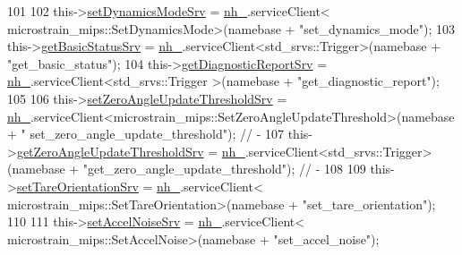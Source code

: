 \begin{DoxyCode}
101 
102                 this->\hyperlink{classcl__microstrain__mips_1_1ClMicrostainMips_a43a684f4010debc4a2ba17d9784712d6}{setDynamicsModeSrv} = \hyperlink{classcl__microstrain__mips_1_1ClMicrostainMips_a5a39ba0864ba2c4c003b6ea427538243}{nh\_}.serviceClient<
      microstrain\_mips::SetDynamicsMode>(namebase + \textcolor{stringliteral}{"set\_dynamics\_mode"});
103                 this->\hyperlink{classcl__microstrain__mips_1_1ClMicrostainMips_ab2d9efccc6237800a890135a4249eaf8}{getBasicStatusSrv} = \hyperlink{classcl__microstrain__mips_1_1ClMicrostainMips_a5a39ba0864ba2c4c003b6ea427538243}{nh\_}.serviceClient<std\_srvs::Trigger>(namebase
       + \textcolor{stringliteral}{"get\_basic\_status"});
104                 this->\hyperlink{classcl__microstrain__mips_1_1ClMicrostainMips_a3d4329c798aa4b7cab1320f35f270192}{getDiagnosticReportSrv} = \hyperlink{classcl__microstrain__mips_1_1ClMicrostainMips_a5a39ba0864ba2c4c003b6ea427538243}{nh\_}.serviceClient<std\_srvs::Trigger
      >(namebase + \textcolor{stringliteral}{"get\_diagnostic\_report"});
105 
106                 this->\hyperlink{classcl__microstrain__mips_1_1ClMicrostainMips_a88ffc1e573993764bb130c97cc64fe08}{setZeroAngleUpdateThresholdSrv} = 
      \hyperlink{classcl__microstrain__mips_1_1ClMicrostainMips_a5a39ba0864ba2c4c003b6ea427538243}{nh\_}.serviceClient<microstrain\_mips::SetZeroAngleUpdateThreshold>(namebase + \textcolor{stringliteral}{"
      set\_zero\_angle\_update\_threshold"}); \textcolor{comment}{//  -}
107                 this->\hyperlink{classcl__microstrain__mips_1_1ClMicrostainMips_ae720970f4114e7b6524b59df405ede83}{getZeroAngleUpdateThresholdSrv} = 
      \hyperlink{classcl__microstrain__mips_1_1ClMicrostainMips_a5a39ba0864ba2c4c003b6ea427538243}{nh\_}.serviceClient<std\_srvs::Trigger>(namebase + \textcolor{stringliteral}{"get\_zero\_angle\_update\_threshold"});                     
              \textcolor{comment}{//  -}
108 
109                 this->\hyperlink{classcl__microstrain__mips_1_1ClMicrostainMips_affd28a64d0ee9bcdb116d974f5e19ec6}{setTareOrientationSrv} = \hyperlink{classcl__microstrain__mips_1_1ClMicrostainMips_a5a39ba0864ba2c4c003b6ea427538243}{nh\_}.serviceClient<
      microstrain\_mips::SetTareOrientation>(namebase + \textcolor{stringliteral}{"set\_tare\_orientation"});
110 
111                 this->\hyperlink{classcl__microstrain__mips_1_1ClMicrostainMips_aed9dd96ff81966ea1fce03173a05bcd8}{setAccelNoiseSrv} = \hyperlink{classcl__microstrain__mips_1_1ClMicrostainMips_a5a39ba0864ba2c4c003b6ea427538243}{nh\_}.serviceClient<
      microstrain\_mips::SetAccelNoise>(namebase + \textcolor{stringliteral}{"set\_accel\_noise"});

\end{DoxyCode}
